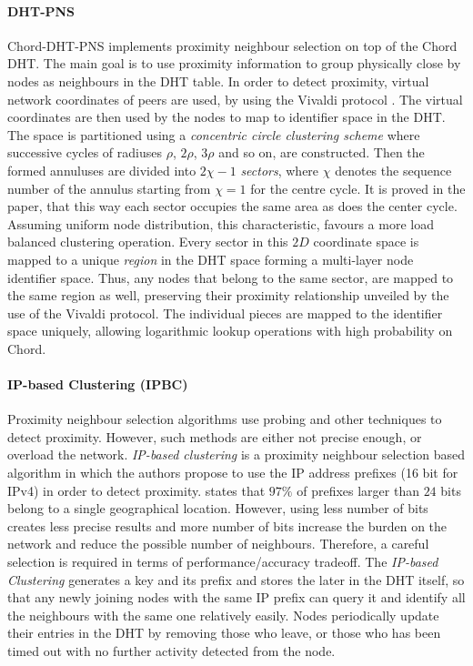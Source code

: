 \paragraph*{\bf DHT-PNS}
Chord-DHT-PNS \cite{hancong_pnsbased_2006} implements proximity neighbour
selection on top of the Chord DHT. The main goal is to use proximity information
to group physically close by nodes as neighbours in the DHT table. In order to
detect proximity, virtual network coordinates of peers are used, by using the
Vivaldi protocol \cite{cox_vivaldi_2004}. The virtual coordinates are then used
by the nodes to map to identifier space in the DHT. The space is partitioned
using a \emph{concentric circle clustering scheme} where successive cycles of
radiuses $\rho$, $2\rho$, $3\rho$ and so on, are constructed. Then the formed
annuluses are divided into $2\chi-1$ \emph{sectors}, where $\chi$ denotes the
sequence number of the annulus starting from $\chi = 1$ for the centre cycle. It
is proved in the paper, that this way each sector occupies the same area as does
the center cycle. Assuming uniform node distribution, this characteristic,
favours a more load balanced clustering operation. Every sector in this $2D$
coordinate space is mapped to a unique \emph{region} in the DHT space forming a
multi-layer node identifier space.  Thus, any nodes that belong to the same
sector, are mapped to the same region as well, preserving their proximity
relationship unveiled by the use of the Vivaldi protocol. The individual pieces
are mapped to the identifier space uniquely, allowing logarithmic lookup
operations with high probability on Chord.

\paragraph*{\bf IP-based Clustering (IPBC)}
Proximity neighbour selection algorithms use probing and other techniques
to detect proximity. However, such methods are either not precise enough, or
overload the network. \emph{IP-based clustering}
\cite{karwaczynski_ipbc_2007} is a proximity neighbour selection based
algorithm in which the authors propose to use the IP address prefixes (16 bit
for IPv4) in order to detect proximity.  \cite{freedman_iploc_2005} states that
$97\%$ of prefixes larger than $24$ bits belong to a single geographical
location. However, using less number of bits creates less precise results and
more number of bits increase the burden on the network and reduce the possible
number of neighbours. Therefore, a careful selection is required in terms of
performance/accuracy tradeoff. The {\em IP-based Clustering} generates a key and
its prefix and stores the later in the DHT itself, so that any newly joining
nodes with the same IP prefix can query it and identify all the
neighbours with the same one relatively easily. Nodes periodically update
their entries in the DHT by removing those who leave, or those who has been
timed out with no further activity detected from the node.

